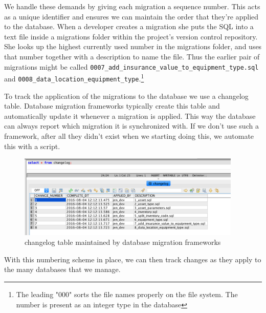 \documentclass[12pt]{article}
\begin{document}
We handle these demands by giving each migration a sequence number. This
acts as a unique identifier and ensures we can maintain the order that
they're applied to the database. When a developer creates a migration
she puts the SQL into a text file inside a migrations folder within the
project's version control repository. She looks up the highest currently
used number in the migrations folder, and uses that number together with
a description to name the file. Thus the earlier pair of migrations
might be called \verb=0007_add_insurance_value_to_equipment_type.sql=
\\ and \verb=0008_data_location_equipment_type=.\footnote{The leading "000"
sorts the file names properly on the file system. The number is present
as an integer type in the database}


To track the application of the migrations to the database we use a
changelog table. Database migration frameworks typically create this
table and automatically update it whenever a migration is applied. This
way the database can always report which migration it is synchronized
with. If we don't use such a framework, after all they didn't exist when
we starting doing this, we automate this with a script.

\begin{figure}[H]
  \begin{center}
    \includegraphics[width=0.95\textwidth]{changelog_screen}
  \end{center}
  \caption{changelog table maintained by database migration frameworks}
  \label{fig:db-changelog}
\end{figure}

With this numbering scheme in place, we can then track changes as they
apply to the many databases that we manage.
\end{document}
